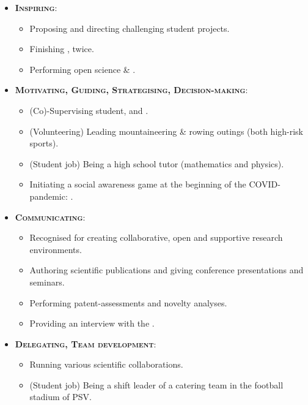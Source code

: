 \documentclass[11pt, a4paper]{article}
\begin{document}
\begin{minipage}[t]{0.9\textwidth}
    \begin{itemize}
        \item \textbf{\textsc{Inspiring}}:
        \begin{itemize}
            \item Proposing and directing challenging student projects.
            \item Finishing , twice.
            \item Performing open science \& .
        \end{itemize}
        \item \textbf{\textsc{Motivating, Guiding, Strategising, Decision-making}}:
        \begin{itemize}
            \item (Co)-Supervising  student, and .
            \item (Volunteering) Leading mountaineering \& rowing outings (both high-risk sports).
            \item (Student job) Being a high school tutor (mathematics and physics).
            \item Initiating a social awareness game at the beginning of the COVID-pandemic: .
        \end{itemize}
        \item \textbf{\textsc{Communicating}}:
        \begin{itemize}
            \item Recognised for creating collaborative, open and supportive research environments.
            \item Authoring scientific publications and giving conference presentations and seminars.
            \item Performing patent-assessments and novelty analyses.
            \item Providing an interview with the .
        \end{itemize}
        \item \textbf{\textsc{Delegating, Team development}}:
        \begin{itemize}
            \item Running various scientific collaborations.
            \item (Student job) Being a shift leader of a catering team in the football stadium of PSV.

\end{itemize}
\end{itemize}
\end{minipage}
\end{document}
